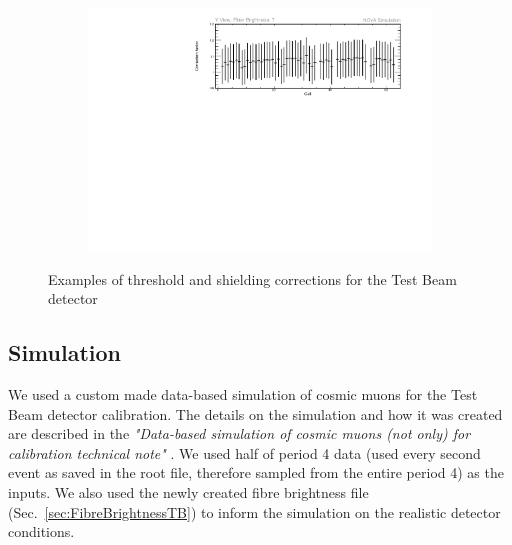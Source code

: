 \begin{figure}[hbtp]
\begin{subfigure}[t]{0.9\textwidth}
\includegraphics[width=\textwidth]{PlotsTBCalibTechnote/ThresholdCorrectionExample_cyview_fb7_P4DataBasedSim.pdf}
\end{subfigure}
\caption{Examples of threshold and shielding corrections for the Test Beam detector}
\label{fig:TBThresholdCorrections}
\end{figure}

\subsection{Simulation}\label{sec:SimulationResults}



We used a custom made data-based simulation of cosmic muons for the Test Beam detector calibration. The details on the simulation and how it was created are described in the \textit{"Data-based simulation of cosmic muons (not only) for calibration technical note"} \cite{NOVA-doc-60026}. We used half of period 4 data (used every second event as saved in the root file, therefore sampled from the entire period 4) as the inputs. We also used the newly created fibre brightness file (Sec.~\ref{sec:FibreBrightnessTB}) to inform the simulation on the realistic detector conditions.

